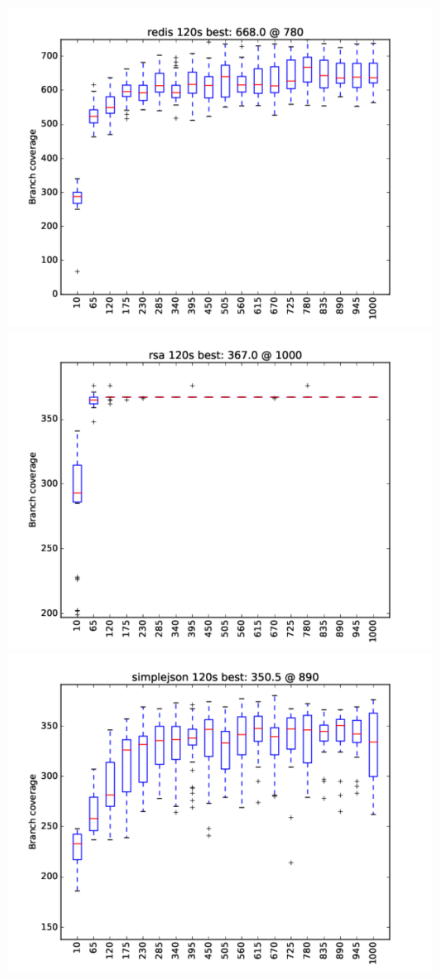 \documentclass[sigplan,screen]{acmart}
\begin{document}
\begin{figure}
\includegraphics[width=0.9\columnwidth]{graphs/redisrand120}
\includegraphics[width=0.9\columnwidth]{graphs/rsarand120}
\includegraphics[width=0.9\columnwidth]{graphs/simplejsonrand120}

\end{figure}
\end{document}
